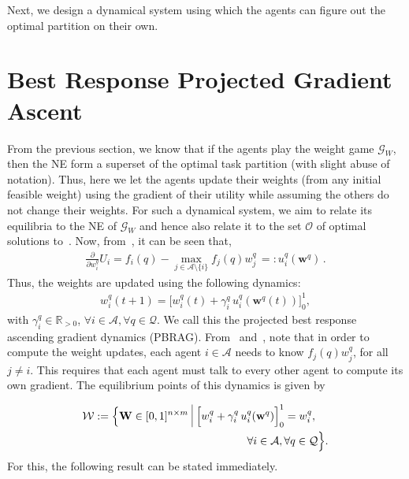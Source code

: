 \documentclass{IEEEtran}
\newcommand{\ldef}{:=}
\newcommand{\rdef}{=:}
\newcommand{\Mcal}[1]{\mathcal{#1}}
\newcommand{\Mc}[1]{\mathcal{#1}}
\newcommand{\bld}[1]{\mathbf{#1}}
\newcommand{\real}{\ensuremath{\mathbb{R}}}
\newcommand{\marginn}[1]{\marginpar{\color{blue}\tiny\ttfamily#1}}
\newcommand{\margin}[1]{\marginpar{\color{magenta}\tiny\ttfamily#1}}
\def \agt{\Mcal{A}}
\def \eqpt{\Mcal{W}}
\def \game{\mathscr{G}}
\def \kcell{[0,1]}
\def \opt{\Mc{O}}
\def \real{\mathbb{R}}
\def \tsk{\Mc{Q}}
\def \w{\bld{w}}
\def \W{\bld{W}}
\def \dynacr{PBRAG}
\begin{document}
Next, we design a dynamical system using which the agents can figure
out the optimal partition on their own.

\section{Best Response Projected Gradient Ascent} \label{sec:grad_ascent}

From the previous section, we know that if the agents play the weight
game $\game_W$, then the NE form a superset of the
optimal task partition (with slight abuse of notation). Thus, here we
let the agents update their weights (from any initial feasible weight)
using the gradient of their utility while assuming the others do not
change their weights. For such a dynamical system, we aim to relate
its equilibria to the NE of $\game_W$ and hence also
relate it to the set $\opt$ of optimal solutions
to~. Now, from~, it can be seen that, 
\begin{align}
	\frac{\partial}{\partial w^q_i}U_i = f_i(q) - \max_{j \in \agt \setminus \{i\}}f_j(q)w^q_j \, \rdef u^q_i (\w^q)\,.
	\label{eq:partial_ui} 
\end{align}
Thus, the weights are updated using the following dynamics:
\begin{align}
	w^q_i(t+1) = \big[ w^q_i(t) + \gamma^q_i \, u^q_i(\w^q(t)) \big]_0^1, %
	\label{eq:weight_dynamics_max}
\end{align}
with $\gamma^q_i \in \real_{>0}$,
$\forall i \in \agt, \forall q \in \tsk$. 
%
%
We call this the projected best response ascending gradient dynamics (\dynacr).
From~ and~, note
that in order to compute the weight updates, each agent $i \in \agt$
needs to know $f_j(q)w^q_j$, for all $j \neq
i$. This requires that each agent must talk to every
other agent  to compute its own gradient.  The equilibrium
points of this dynamics is given by

\vspace{-.3cm}
\begin{align}
	\notag & \eqpt \ldef  \Big\{ \W \in \kcell^{n \times m} \ \vline \  \Big[w^q_i + \gamma^q_i \, u^q_i(\w^q) \Big]_0^1 = w^q_i,\\ 
	& \hspace{15em} \forall i \in \agt, \forall q \in \tsk \Big\}.
	\label{eq:eqpt}
\end{align}
For this, the following result can be stated immediately.
\end{document}
